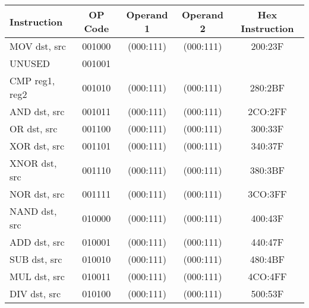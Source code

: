 \documentclass[a4paper, 11pt]{report}
\begin{document}
\begin{center}
    \begin{tabular}{|l|c|c|c|c|}
        \hline
        \textbf{Instruction} & \textbf{OP Code} & \textbf{Operand 1} & \textbf{Operand 2} & \textbf{Hex Instruction} \\
        \hline
        MOV dst, src         & 001000           & (000:111)          & (000:111)          & 200:23F                  \\
        \hline
        UNUSED               & 001001           &                    &                    &                          \\
        \hline
        CMP reg1, reg2       & 001010           & (000:111)          & (000:111)          & 280:2BF                  \\
        \hline
        AND dst, src         & 001011           & (000:111)          & (000:111)          & 2CO:2FF                  \\
        \hline
        OR dst, src          & 001100           & (000:111)          & (000:111)          & 300:33F                  \\
        \hline
        XOR dst, src         & 001101           & (000:111)          & (000:111)          & 340:37F                  \\
        \hline
        XNOR dst, src        & 001110           & (000:111)          & (000:111)          & 380:3BF                  \\
        \hline
        NOR dst, src         & 001111           & (000:111)          & (000:111)          & 3CO:3FF                  \\
        \hline
        NAND dst, src        & 010000           & (000:111)          & (000:111)          & 400:43F                  \\
        \hline
        ADD dst, src         & 010001           & (000:111)          & (000:111)          & 440:47F                  \\
        \hline
        SUB dst, src         & 010010           & (000:111)          & (000:111)          & 480:4BF                  \\
        \hline
        MUL dst, src         & 010011           & (000:111)          & (000:111)          & 4CO:4FF                  \\
        \hline
        DIV dst, src         & 010100           & (000:111)          & (000:111)          & 500:53F                  \\
        \hline
    \end{tabular}
\end{center}
\pagebreak
\end{document}
